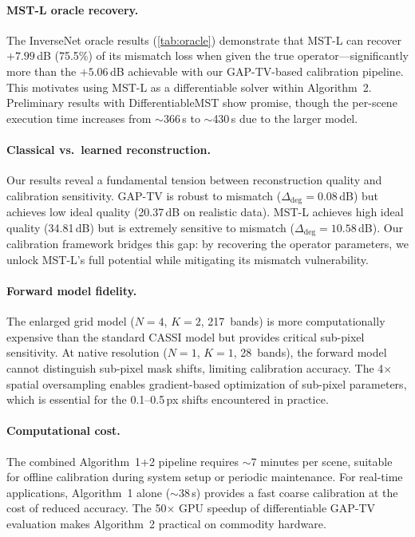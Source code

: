\documentclass[runningheads]{llncs}
\begin{document}
\paragraph{MST-L oracle recovery.}
The InverseNet oracle results (\cref{tab:oracle}) demonstrate that MST-L can recover $+7.99$\,dB (75.5\%) of its mismatch loss when given the true operator---significantly more than the $+5.06$\,dB achievable with our GAP-TV-based calibration pipeline.
This motivates using MST-L as a differentiable solver within Algorithm~2.
Preliminary results with DifferentiableMST show promise, though the per-scene execution time increases from $\sim$366\,s to $\sim$430\,s due to the larger model.

\paragraph{Classical vs.\ learned reconstruction.}
Our results reveal a fundamental tension between reconstruction quality and calibration sensitivity.
GAP-TV is robust to mismatch ($\Delta_{\text{deg}} = 0.08$\,dB) but achieves low ideal quality (20.37\,dB on realistic data).
MST-L achieves high ideal quality (34.81\,dB) but is extremely sensitive to mismatch ($\Delta_{\text{deg}} = 10.58$\,dB).
Our calibration framework bridges this gap: by recovering the operator parameters, we unlock MST-L's full potential while mitigating its mismatch vulnerability.

\paragraph{Forward model fidelity.}
The enlarged grid model ($N\!=\!4$, $K\!=\!2$, 217~bands) is more computationally expensive than the standard CASSI model but provides critical sub-pixel sensitivity.
At native resolution ($N\!=\!1$, $K\!=\!1$, 28~bands), the forward model cannot distinguish sub-pixel mask shifts, limiting calibration accuracy.
The 4$\times$ spatial oversampling enables gradient-based optimization of sub-pixel parameters, which is essential for the 0.1--0.5\,px shifts encountered in practice.

\paragraph{Computational cost.}
The combined Algorithm~1+2 pipeline requires $\sim$7 minutes per scene, suitable for offline calibration during system setup or periodic maintenance.
For real-time applications, Algorithm~1 alone ($\sim$38\,s) provides a fast coarse calibration at the cost of reduced accuracy.
The 50$\times$ GPU speedup of differentiable GAP-TV evaluation makes Algorithm~2 practical on commodity hardware.
\end{document}
